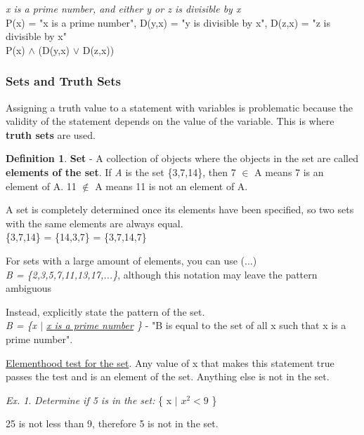 \documentclass[11pt]{article}
\theoremstyle{definition}
\newtheorem{defn}{Definition}
\theoremstyle{remark}
\newtheorem{exer}{Ex.}
\begin{document}
\textit{x is a prime number, and either y or z is divisible by x} \\
P(x) = "x is a prime number", D(y,x) = "y is divisible by x", D(z,x) = "z is divisible by x" \\
P(x) $\land$ (D(y,x) $\lor$ D(z,x))

\subsubsection{Sets and Truth Sets}

Assigning a truth value to a statement with variables is problematic because the validity of the statement depends on the value of the variable. This is where \textbf{truth sets} are used.
\begin{shaded}
\begin{defn}
\textbf{Set} - A collection of objects where the objects in the set are called \textbf{elements of the set}. If \textit{A} is the set \{3,7,14\}, then 7 $\in$ A means 7 is an element of A. 11 $\notin$ A means 11 is not an element of A.
\end{defn}
\end{shaded}
A set is completely determined once its elements have been specified, so two sets with the same elements are always equal. \\
\{3,7,14\} = \{14,3,7\} = \{3,7,14,7\}

For sets with a large amount of elements, you can use (...)\\
\textit{B = \{2,3,5,7,11,13,17,...\}}, although this notation may leave the pattern ambiguous 

Instead, explicitly state the pattern of the set.\\
\textit{B = \{x $|$ \underline{x is a prime number} \}} - "B is equal to the set of all x such that x is a prime number".

\underline{Elementhood test for the set}. Any value of x that makes this statement true passes the test and is an element of the set. Anything else is not in the set.
\begin{exer}
\textit{Determine if 5 is in the set: } \{ x $|$ $x^2 < 9$ \}

25 is not less than 9, therefore 5 is not in the set.
\end{exer}
\end{document}
